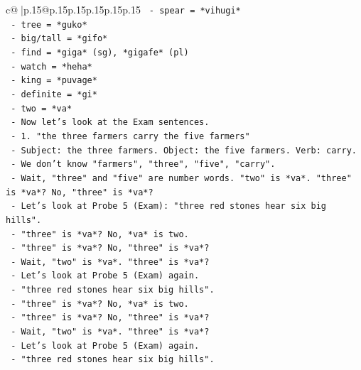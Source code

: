 \documentclass{article}
\begin{document}
{\begin{supertabular}{c@{$\;$}|p{.15\linewidth}@{}p{.15\linewidth}p{.15\linewidth}p{.15\linewidth}p{.15\linewidth}p{.15\linewidth}}
{{{\texttt{                {-} spear = *vihugi*} \\
\texttt{                {-} tree = *guko*} \\
\texttt{                {-} big/tall = *gifo*} \\
\texttt{                {-} find = *giga* (sg), *gigafe* (pl)} \\
\texttt{                {-} watch = *heha*} \\
\texttt{                {-} king = *puvage*} \\
\texttt{                {-} definite = *gi*} \\
\texttt{                {-} two = *va*} \\
\texttt{              {-} Now let's look at the Exam sentences.} \\
\texttt{              {-} 1. "the three farmers carry the five farmers"} \\
\texttt{                {-} Subject: the three farmers. Object: the five farmers. Verb: carry.} \\
\texttt{                {-} We don't know "farmers", "three", "five", "carry".} \\
\texttt{                {-} Wait, "three" and "five" are number words. "two" is *va*. "three" is *va*? No, "three" is *va*?} \\
\texttt{                {-} Let's look at Probe 5 (Exam): "three red stones hear six big hills".} \\
\texttt{                {-} "three" is *va*? No, *va* is two.} \\
\texttt{                {-} "three" is *va*? No, "three" is *va*?} \\
\texttt{                {-} Wait, "two" is *va*. "three" is *va*?} \\
\texttt{                {-} Let's look at Probe 5 (Exam) again.} \\
\texttt{                {-} "three red stones hear six big hills".} \\
\texttt{                {-} "three" is *va*? No, *va* is two.} \\
\texttt{                {-} "three" is *va*? No, "three" is *va*?} \\
\texttt{                {-} Wait, "two" is *va*. "three" is *va*?} \\
\texttt{                {-} Let's look at Probe 5 (Exam) again.} \\
\texttt{                {-} "three red stones hear six big hills".} \\
}}}
\end{supertabular}}
\end{document}
